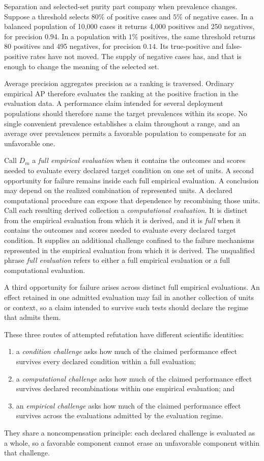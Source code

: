 \documentclass[11pt]{article}
\theoremstyle{remark}
\begin{document}
Separation and selected-set purity part company when prevalence changes.
Suppose a threshold selects $80\%$ of positive cases and $5\%$ of negative
cases. In a balanced population of 10,000 cases it returns 4,000 positives and
250 negatives, for precision $0.94$. In a population with $1\%$ positives, the
same threshold returns 80 positives and 495 negatives, for precision $0.14$.
Its true-positive and false-positive rates have not moved. The supply of
negative cases has, and that is enough to change the meaning of the selected
set.

Average precision aggregates precision as a ranking is traversed. Ordinary
empirical AP therefore evaluates the ranking at the positive fraction in the
evaluation data. A performance claim intended for several deployment
populations should therefore name the target prevalences within its scope.
No single convenient prevalence establishes a claim throughout a range, and an
average over prevalences permits a favorable population to compensate for an
unfavorable one.

Call $D_m$ a \emph{full empirical evaluation} when it contains the outcomes and
scores needed to evaluate every declared target condition on one set of units.
A second opportunity for failure remains inside each full empirical
evaluation. A conclusion may depend on the realized combination of represented
units. A declared computational procedure can expose that dependence by recombining
those units. Call each resulting derived collection a \emph{computational
evaluation}. It is distinct from the empirical evaluation from which it is
derived, and it is \emph{full} when it contains the outcomes and scores needed
to evaluate every declared target condition. It supplies an additional
challenge confined to the failure mechanisms represented in the empirical
evaluation from which it is derived. The unqualified phrase \emph{full
evaluation} refers to either a full empirical evaluation or a full
computational evaluation.

A third opportunity for failure arises across distinct full empirical
evaluations. An effect retained in one admitted evaluation may fail in another
collection of units or context, so a claim intended to survive such tests should
declare the regime that admits them.

These three routes of attempted refutation have different scientific
identities:
\begin{enumerate}
\item a \emph{condition challenge} asks how much of the claimed performance
effect survives every declared condition within a full evaluation;
\item a \emph{computational challenge} asks how much of the claimed
performance effect survives declared recombinations within one empirical
evaluation; and
\item an \emph{empirical challenge} asks how much of the claimed performance
effect survives across the evaluations admitted by the evaluation regime.
\end{enumerate}
They share a noncompensation principle: each declared challenge is evaluated
as a whole, so a favorable component cannot erase an unfavorable component
within that challenge.
\end{document}
